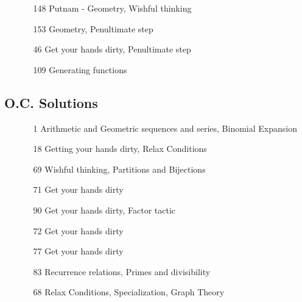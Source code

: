\documentclass[11pt]{article}
\begin{document}
\begin{itemize}
\begin{itemize}
    \end{itemize}
    \item[\text{Nov 22 Sub. }] \begin{itemize}
        \item[148] Putnam - Geometry, Wishful thinking
        \item[153] Geometry, Penultimate step
    \end{itemize}
    \item[\text{Dec 3 ReSub. }]\begin{itemize}
        \item[46] Get your hands dirty, Penultimate step
        \item[109] Generating functions
    \end{itemize}

\end{itemize}

\subsection{O.C. Solutions}
\begin{itemize}
    \item[\text{Sept 27 Sub. }] \begin{itemize}
        \item[1] Arithmetic and Geometric sequences and series, Binomial Expansion
    \end{itemize}
    \item[\text{Oct 4 Sub. }] \begin{itemize}
        \item[18] Getting your hands dirty, Relax Conditions
    \end{itemize}
    \item[\text{Nov 8 Sub. }] \begin{itemize}
        \item[69] Wishful thinking, Partitions and Bijections
        \item[71] Get your hands dirty
    \end{itemize}
    \item[\text{Nov 15 Sub. }] \begin{itemize}
        \item[90] Get your hands dirty, Factor tactic 
    \end{itemize}
    \item[\text{Nov 22 Sub. }] \begin{itemize}
        \item[72] Get your hands dirty
        \item[77] Get your hands dirty
        \item[83] Recurrence relations, Primes and divisibility
    \end{itemize}
    \item[\text{Dec 3 ReSub.}]\begin{itemize}
        \item[68] Relax Conditions, Specialization, Graph Theory 
    \end{itemize}
\end{itemize}
\end{document}
